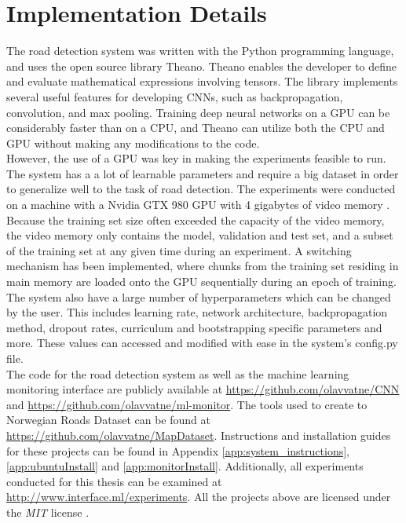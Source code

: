 \section{Implementation Details}
\label{sec:methods_implementation_details}
The road detection system was written with the Python programming language, and uses the open source library Theano. Theano enables the developer to define and evaluate mathematical expressions involving tensors. The library implements several useful features for developing \ac{CNN}s, such as backpropagation, convolution, and max pooling. Training deep neural networks on a \ac{GPU} can be considerably faster than on a \ac{CPU}, and Theano can utilize both the \ac{CPU} and \ac{GPU} without making any modifications to the code.\\

However, the use of a \ac{GPU} was key in making the experiments feasible to run. The system has a a lot of learnable  parameters and require a big dataset in order to generalize well to the task of road detection. The experiments were conducted on a machine with a Nvidia GTX 980 \ac{GPU} with 4 gigabytes of video memory . \\

Because the training set size often exceeded the capacity of the video memory, the video memory only contains the model, validation and test set, and a subset of the training set at any given time during an experiment. A switching mechanism has been implemented, where chunks from the training set residing in main memory are loaded onto the \ac{GPU} sequentially during an epoch of training.\\

The system also have a large number of hyperparameters which can be changed by the user. This includes learning rate, network architecture, backpropagation method, dropout rates, curriculum and bootstrapping specific parameters and more. These values can accessed and modified with ease in the system's config.py file. \\

The code for the road detection system as well as the machine learning monitoring interface are publicly available at 
\url{https://github.com/olavvatne/CNN} and \url{https://github.com/olavvatne/ml-monitor}. The tools used to create to Norwegian Roads Dataset can be found at \url{https://github.com/olavvatne/MapDataset}. Instructions and installation guides for these projects can be found in Appendix \ref{app:system_instructions}, \ref{app:ubuntuInstall} and \ref{app:monitorInstall}. Additionally, all experiments conducted for this thesis can be examined at \url{http://www.interface.ml/experiments}. All the projects above are licensed under the \emph{MIT} license .

